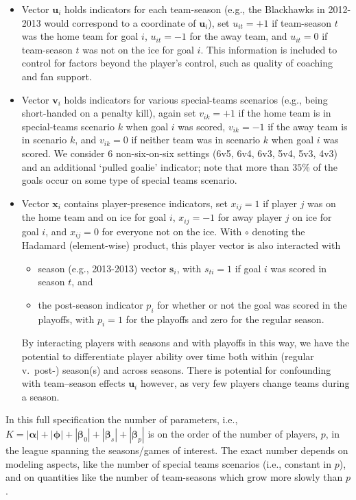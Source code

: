\begin{itemize}
\item Vector $\mathbf{u}_i$ holds indicators for each team-season (e.g., the Blackhawks in 2012-2013 would correspond to a coordinate of $\mathbf{u}_i$), set 
$u_{it}=+1$ if team-season $t$ was the home team for goal $i$, $u_{it}=-1$ for the away team, and $u_{it}=0$ if team-season $t$ was not on the ice for goal $i$.  This information is included to control for factors beyond the player's control, such as quality of coaching and fan support.
\item Vector $\mathbf{v}_i$ holds indicators for various special-teams scenarios (e.g., being short-handed on a penalty kill), again set $v_{ik}=+1$ if the home team is in special-teams scenario $k$ when goal $i$ was scored, $v_{ik}=-1$ if the away team is in scenario $k$, and $v_{ik}=0$ if neither team was in scenario $k$ when goal $i$ was scored.  We consider $6$ non-six-on-six settings (6v5, 6v4, 6v3, 5v4, 5v3, 4v3) and an additional `pulled goalie' indicator; note that more than $35\%$ of the goals occur on some type of special teams scenario. 
\item Vector
$\mathbf{x}_i$ contains player-presence indicators, set $x_{ij}=1$ if player $j$ was on the
home team and on ice for goal $i$, $x_{ij}=-1$ for away player $j$ on ice for
goal $i$, and $x_{ij}=0$ for everyone not on the ice. With $\circ$ denoting the Hadamard (element-wise) product, this player vector is also interacted with 
\begin{itemize}
\item  season (e.g., 2013-2013) vector $\mathbf{s}_i$, with $s_{ti} = 1$ if goal $i$ was scored in season $t$, and
\item the post-season indicator $p_i$  for whether or not the goal was scored in the playoffs, with $p_{i} =1$ for the playoffs and zero for the regular season.
\end{itemize}  
By interacting players with seasons and with playoffs in this way, we have the
potential to differentiate player ability over time both within (regular
v.~post-) season(s) and across seasons.  There is potential for confounding
with team--season effects $\mathbf{u}_i$ however, as very few players change
teams during a season.

\end{itemize}
In this full specification the number of parameters, i.e., $K =
|\boldsymbol{\alpha}|+ | \boldsymbol{\phi}| + |\boldsymbol{\beta}_0| +
|\boldsymbol{\beta}_s| + |\boldsymbol{\beta}_p|$ is on the order of the number
of players, $p$, in the league spanning the seasons/games of interest.  The
exact number depends on modeling aspects, like the number of special teams
scenarios (i.e., constant in $p$), and on quantities like the number of
team-seasons which grow more slowly than $p$.

